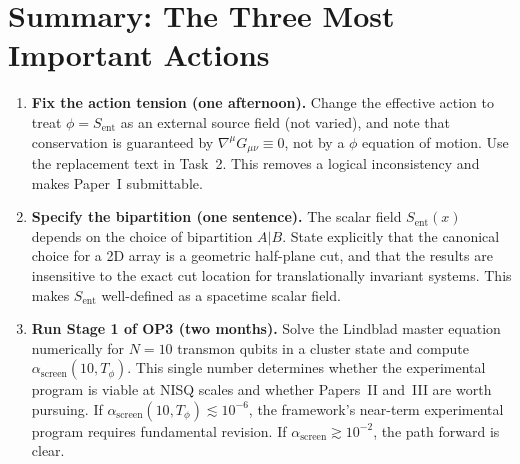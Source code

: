 \documentclass[12pt,letterpaper]{article}
\theoremstyle{plain}
\theoremstyle{definition}
\theoremstyle{remark}
\newcommand{\Sent}{S_{\mathrm{ent}}}
\newcommand{\asc}{\alpha_{\mathrm{screen}}}
\begin{document}
\section*{Summary: The Three Most Important Actions}

\begin{enumerate}
\item \textbf{Fix the action tension (one afternoon).} Change the effective action to treat $\phi = \Sent$ as an external source field (not varied), and note that conservation is guaranteed by $\nabla^\mu G_{\mu\nu} \equiv 0$, not by a $\phi$ equation of motion. Use the replacement text in Task~2. This removes a logical inconsistency and makes Paper~I submittable.

\item \textbf{Specify the bipartition (one sentence).} The scalar field $\Sent(x)$ depends on the choice of bipartition $A|B$. State explicitly that the canonical choice for a 2D array is a geometric half-plane cut, and that the results are insensitive to the exact cut location for translationally invariant systems. This makes $\Sent$ well-defined as a spacetime scalar field.

\item \textbf{Run Stage 1 of OP3 (two months).} Solve the Lindblad master equation numerically for $N = 10$ transmon qubits in a cluster state and compute $\asc(10, T_\phi)$. This single number determines whether the experimental program is viable at NISQ scales and whether Papers~II and~III are worth pursuing. If $\asc(10, T_\phi) \lesssim 10^{-6}$, the framework's near-term experimental program requires fundamental revision. If $\asc \gtrsim 10^{-2}$, the path forward is clear.
\end{enumerate}
\end{document}
